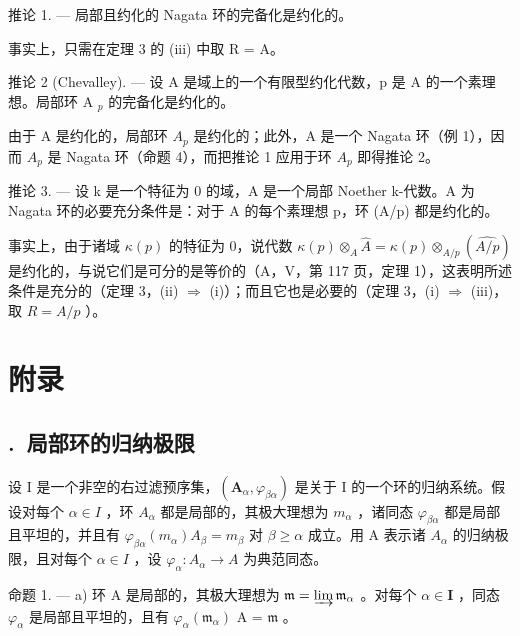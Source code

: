推论 1. --- 局部且约化的 Nagata 环的完备化是约化的。

事实上，只需在定理 3 的 (iii) 中取 R = A。

推论 2 (Chevalley). --- 设 A 是域上的一个有限型约化代数，p 是 A 的一个素理想。局部环 A \(_{p}\) 的完备化是约化的。

由于 A 是约化的，局部环 \(A_{p}\) 是约化的；此外，A 是一个 Nagata 环（例 1），因而 \(A_{p}\) 是 Nagata 环（命题 4），而把推论 1 应用于环 \(A_{p}\) 即得推论 2。

推论 3. --- 设 k 是一个特征为 0 的域，A 是一个局部 Noether k-代数。A 为 Nagata 环的必要充分条件是：对于 A 的每个素理想 p，环 (A/p) 都是约化的。

事实上，由于诸域 \(\kappa(p)\) 的特征为 0，说代数 \(\kappa(p) \otimes_{A} \hat{A} = \kappa(p) \otimes_{A/p} (\widehat{A/p})\) 是约化的，与说它们是可分的是等价的（A，V，第 117 页，定理 1），这表明所述条件是充分的（定理 3，(ii) \(\Rightarrow\) (i)）；而且它也是必要的（定理 3，(i) \(\Rightarrow\) (iii)，取 \(R = A/p\) ）。

\section*{附录}
{}

\subsection*{\theappendixitem.\ 局部环的归纳极限}
{}

设 I 是一个非空的右过滤预序集，\((\mathbf{A}_{\alpha}, \varphi_{\beta\alpha})\) 是关于 I 的一个环的归纳系统。假设对每个 \(\alpha \in I\) ，环 \(A_{\alpha}\) 都是局部的，其极大理想为 \(m_{\alpha}\) ，诸同态 \(\varphi_{\beta\alpha}\) 都是局部且平坦的，并且有 \(\varphi_{\beta\alpha}(m_{\alpha}) A_{\beta} = m_{\beta}\) 对 \(\beta \geqslant \alpha\) 成立。用 A 表示诸 \(A_{\alpha}\) 的归纳极限，且对每个 \(\alpha \in I\) ，设 \(\varphi_{\alpha}: A_{\alpha} \to A\) 为典范同态。

命题 1. --- a) 环 A 是局部的，其极大理想为 \(\mathfrak{m} = \varinjlim \mathfrak{m}_{\alpha}\) 。对每个 \(\alpha \in \mathbf{I}\) ，同态 \(\varphi_{\alpha}\) 是局部且平坦的，且有 \(\varphi_{\alpha}(\mathfrak{m}_{\alpha})\) A = \(\mathfrak{m}\) 。

